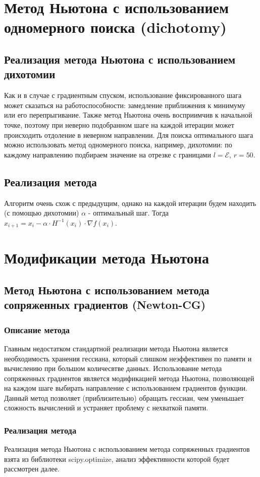 \documentclass{article}
\begin{document}
\section*{Метод Ньютона с использованием одномерного поиска (dichotomy)}
\subsection*{Реализация метода Ньютона с использованием дихотомии}
Как и в случае с градиентным спуском, использование фиксированного шага может сказаться на работоспособности: замедление приближения к минимуму или его перепрыгивание. Также метод Ньютона очень восприимчив к начальной точке, поэтому при неверно подобранном шаге на каждой итерации может происходить отдоление в неверном направлении. Для поиска оптимального шага можно использовать метод одномерного поиска, например, дихотомии: по каждому направлению подбираем значение на отрезке с границами $l = \mathcal{E}$, $r = 50$.
\subsection*{Реализация метода}
Алгоритм очень схож с предыдущим, однако на каждой итерации будем находить (с помощью дихотомии) $\alpha$ - оптимальный шаг. Тогда $x_{i+1} = x_i - \alpha \cdot H^{-1}(x_i) \cdot \nabla f(x_i)$.
\section*{Модификации метода Ньютона}
\subsection*{Метод Ньютона с использованием метода сопряженных градиентов (Newton-CG)}
\subsubsection*{Описание метода}
Главным недостатком стандартной реализации метода Ньютона является необходимость хранения гессиана, который слишком неэффективен по памяти и вычислению при большом количесвтве данных. Использование метода сопряженных градиентов является модификацией метода Ньютона, позволяющей на каждом шаге выбирать направление с использованием градиентов функции. Данный метод позволяет (приблизительно) обращать гессиан, чем уменьшает сложность вычислений и устраняет проблему с нехваткой памяти.
\subsubsection*{Реализация метода}
Реализация метода Ньютона с использованием метода сопряженных градиентов взята из библиотеки scipy.optimize, анализ эффективности которой будет рассмотрен далее.
\end{document}
